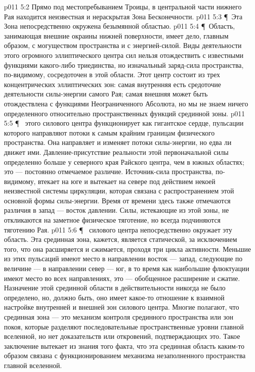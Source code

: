 \vs p011 5:2 \bibnobreakspace Прямо под местопребыванием Троицы, в центральной части нижнего Рая находится неизвестная и нераскрытая Зона Бесконечности.
\vs p011 5:3 \P\ \bibnobreakspace Эта Зона непосредственно окружена безымянной областью.
\vs p011 5:4 \P\ \bibnobreakspace Область, занимающая внешние окраины нижней поверхности, имеет дело, главным образом, с могуществом пространства и с энергией\hyp{}силой. Виды деятельности этого огромного эллиптического центра сил нельзя отождествить с известными функциями какого\hyp{}либо триединства, но изначальный заряд\hyp{}сила пространства, по\hyp{}видимому, сосредоточен в этой области. Этот центр состоит из трех концентрических эллиптических зон: самая внутренняя есть средоточие деятельности силы\hyp{}энергии самого Рая; самая внешняя может быть отождествлена с функциями Неограниченного Абсолюта, но мы не знаем ничего определенного относительно пространственных функций срединной зоны.
\vs p011 5:5 \P\  этого силового центра функционирует как гигантское сердце, пульсации которого направляют потоки к самым крайним границам физического пространства. Она направляет и изменяет потоки силы\hyp{}энергии, но едва ли движет ими. Давление\hyp{}присутствие реальности этой первоначальной силы определенно больше у северного края Райского центра, чем в южных областях; это --- постоянно отмечаемое различие. Источник\hyp{}сила пространства, по\hyp{}видимому, втекает на юге и вытекает на севере под действием некоей неизвестной системы циркуляции, которая связана с распространением этой основной формы силы\hyp{}энергии. Время от времени здесь также отмечаются различия в запад --- восток давлении. Силы, истекающие из этой зоны, не откликаются на заметное физическое тяготение, но всегда подчиняются тяготению Рая.
\vs p011 5:6 \P\  силового центра непосредственно окружает эту область. Эта срединная зона, кажется, является статической, за исключением того, что она расширяется и сжимается, проходя три цикла активности. Меньшие из этих пульсаций имеют место в направлении восток --- запад, следующие по величине --- в направлении север --- юг, в то время как наибольшие флюктуации имеют место во всех направлениях, это --- обобщенное расширение и сжатие. Назначение этой срединной области в действительности никогда не было определено, но, должно быть, оно имеет какое\hyp{}то отношение к взаимной настройке внутренней и внешней зон силового центра. Многие полагают, что срединная зона --- это механизм контроля срединного пространства или зон покоя, которые разделяют последовательные пространственные уровни главной вселенной, но нет доказательств или откровений, подтверждающих это. Такое заключение вытекает из знания того факта, что эта срединная область каким\hyp{}то образом связана с функционированием механизма незаполненного пространства главной вселенной.
